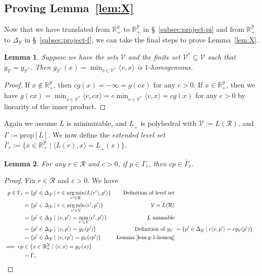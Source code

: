 \documentclass[11pt]{article}
\newcommand{\reals}{\mathbb{R}}
\newcommand{\prop}[1]{\mathrm{prop}[#1]}
\newcommand{\simplex}{\Delta_\Y}
\newcommand{\R}{\mathcal{R}}
\newcommand{\V}{\mathcal{V}}
\newcommand{\Y}{\mathcal{Y}}
\newcommand{\risk}[1]{\underline{#1}}
\newcommand{\inprod}[2]{\langle #1, #2 \rangle}%
\DeclareMathOperator*{\argmin}{arg\,min}
\newtheorem{lemma}{Lemma}
\begin{document}
\subsection{Proving Lemma~\ref{lem:X}}\label{subsec:lem-X-proof}
Now that we have translated from $\reals^d_+$ to $\reals^\Y_+$ in \S~\ref{subsec:project-pi} and from $\reals^\Y_+$ to $\simplex$ in \S~\ref{subsec:project-f}, we can take the final steps to prove Lemma~\ref{lem:X}.
\begin{lemma}\label{lem:g-1-homog}
	Suppose we have the sets $\V$ and the finite set $\V^* \subseteq \V$ such that $g_\V = g_{\V^*}$.
	Then $g_{\V^*}(x) = \min_{v \in \V^*}\inprod{v}{x}$ is $1$-homogeneous.
\end{lemma}
\begin{proof}
	If $x \not \in \reals^\Y_+$, then $c g(x) = -\infty = g(cx)$ for any $c > 0$.
	If $x \in \reals^\Y_+$, then we have $g(cx) = \min_{v \in \V^*}\inprod{v}{cx} = c \min_{v \in \V^*}\inprod{v}{x} = c g(x)$ for any $c > 0$ by linearity of the inner product.
\end{proof}


Again we assume $L$ is minimizable, and $\risk L_+$ is polyhedral with $\V := L(\R)$, and $\Gamma := \prop{L}$.
We now define the \emph{extended level set} $\bar \Gamma_r := \{x \in \reals^\Y_+ \mid \inprod{L(r)}{x} = \risk L_+(x)\}$.

\begin{lemma}\label{lem:levelset-to-extended-levelset}
	For any $r \in \R$ and $c > 0$, if $p \in \Gamma_r$, then $cp \in \bar \Gamma_r$. 
\end{lemma}
\begin{proof}
	Fix $r \in \R$ and $c > 0$.
	We have
	\begin{align*}
	p \in \Gamma_r
	&= \{p' \in \simplex \mid r \in \argmin_{r' \in \R} \inprod{L(r')}{p'} \} & \text {Definition of level set} \\
	&= \{p' \in \simplex \mid v \in \argmin_{v' \in \V} \inprod{v'}{p'} \} & \text {$\V = L(\R)$} \\
	&= \{p' \in \simplex \mid \inprod{v}{p'} = \min_{v' \in \V} \inprod{v'}{p'} \} & \text {$L$ minnable} \\
	&= \{p' \in \simplex \mid \inprod{v}{p'} = g_\V(p') \} & \text {Definition of $g_\V$} \
	&= \{p' \in \simplex \mid c \inprod{v}{p'} = c g_\V(p') \} &  \\
	&= \{p' \in \simplex \mid  \inprod{v}{cp'} = g_\V(cp') \} & \text {Lemma~\ref{lem:g-1-homog}} \\
	\implies cp
	&\in \{x \in \reals^\Y_+ \mid \inprod{v}{x} = g_\V(x)\}\\
	&= \bar \Gamma_r
	\end{align*}
\end{proof}
\end{document}
